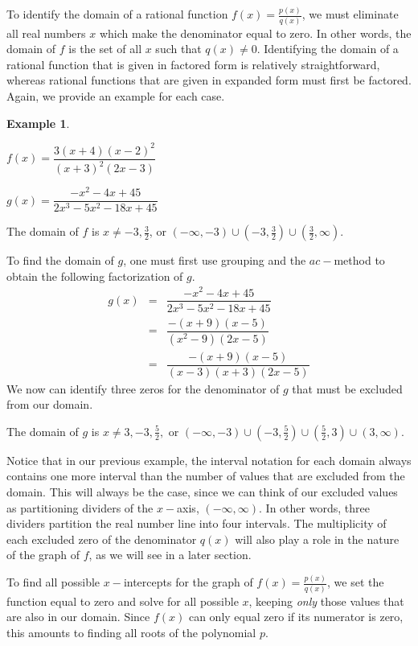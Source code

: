 \documentclass[12pt]{book}
\theoremstyle{definition}
\newtheorem{example}{Example}
\begin{document}
To identify the domain of a rational function $f(x)=\frac{p(x)}{q(x)}$, we must eliminate all real numbers $x$ which make the denominator equal to zero.  In other words, the domain of $f$ is the set of all $x$ such that $q(x)\neq 0$.  Identifying the domain of a rational function that is given in factored form is relatively straightforward, whereas rational functions that are given in expanded form must first be factored.  Again, we provide an example for each case.
\begin{example}\label{horiz_asym_0}
\begin{multicols}{2}
$f(x)=\dfrac{3(x+4)(x-2)^2}{(x+3)^2(2x-3)}$
\par
$g(x)=\dfrac{-x^2-4x+45}{2x^3-5x^2-18x+45}$
\end{multicols}
The domain of $f$ is $x\neq -3,\frac{3}{2}$, or $(-\infty,-3)\cup(-3,\frac{3}{2})\cup(\frac{3}{2},\infty)$.
\par
To find the domain of $g$, one must first use grouping and the $ac-$method to obtain the following factorization of $g$.
\begin{eqnarray*}
 g(x) & = & \dfrac{-x^2-4x+45}{2x^3-5x^2-18x+45}\\
      & = & \dfrac{-(x+9)(x-5)}{(x^2-9)(2x-5)}\\
      & = & \dfrac{-(x+9)(x-5)}{(x-3)(x+3)(2x-5)}
\end{eqnarray*}
We now can identify three zeros for the denominator of $g$ that must be excluded from our domain.
\par
The domain of $g$ is $x\neq 3,-3,\frac{5}{2},$ or $(-\infty,-3)\cup(-3,\frac{5}{2})\cup(\frac{5}{2},3)\cup(3,\infty).$
\end{example}
Notice that in our previous example, the interval notation for each domain always contains one more interval than the number of values that are excluded from the domain.  This will always be the case, since we can think of our excluded values as partitioning dividers of the $x-$axis, $(-\infty,\infty)$.  In other words, three dividers partition the real number line into four intervals.  The multiplicity of each excluded zero of the denominator $q(x)$ will also play a role in the nature of the graph of $f$, as we will see in a later section.
\par
To find all possible $x-$intercepts for the graph of $f(x)=\frac{p(x)}{q(x)}$, we set the function equal to zero and solve for all possible $x$, keeping \textit{only} those values that are also in our domain.  Since $f(x)$ can only equal zero if its numerator is zero, this amounts to finding all roots of the polynomial $p$.
\end{document}

